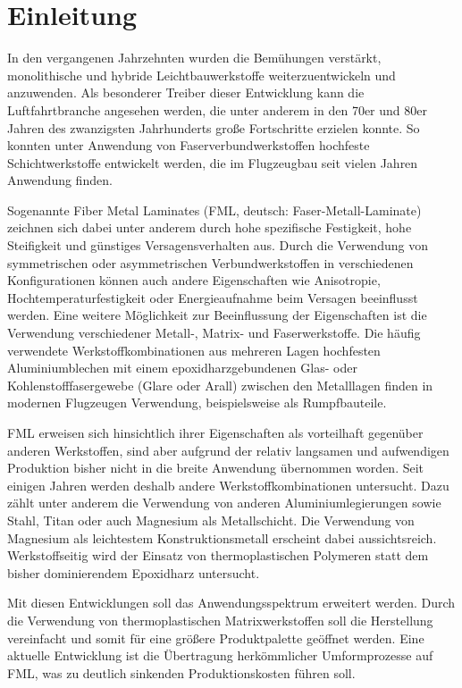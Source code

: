 \chapter{Einleitung}\label{Einleit}

In den vergangenen Jahrzehnten wurden die Bemühungen verstärkt, monolithische und hybride  Leichtbauwerkstoffe weiterzuentwickeln und anzuwenden. Als besonderer Treiber dieser Entwicklung kann die Luftfahrtbranche angesehen werden, die unter anderem in den 70er und 80er Jahren des zwanzigsten Jahrhunderts große Fortschritte erzielen konnte. So konnten unter Anwendung von Faserverbundwerkstoffen hochfeste Schichtwerkstoffe entwickelt werden, die im Flugzeugbau seit vielen Jahren Anwendung finden.

Sogenannte Fiber Metal Laminates (FML, deutsch: Faser-Metall-Laminate) zeichnen sich dabei unter anderem durch hohe spezifische Festigkeit, hohe Steifigkeit und günstiges Versagensverhalten aus. Durch die Verwendung von symmetrischen oder asymmetrischen Verbundwerkstoffen in verschiedenen Konfigurationen können auch andere Eigenschaften wie Anisotropie, Hochtemperaturfestigkeit oder Energieaufnahme beim Versagen beeinflusst werden. Eine weitere Möglichkeit zur Beeinflussung der Eigenschaften ist die Verwendung verschiedener Metall-, Matrix- und Faserwerkstoffe. 
Die häufig verwendete Werkstoffkombinationen aus mehreren Lagen hochfesten Aluminiumblechen mit einem epoxidharzgebundenen Glas- oder Kohlenstofffasergewebe (Glare oder Arall) zwischen den Metalllagen finden in modernen Flugzeugen Verwendung, beispielsweise als Rumpfbauteile.

FML erweisen sich hinsichtlich ihrer Eigenschaften als vorteilhaft gegenüber anderen Werkstoffen, sind aber aufgrund der relativ langsamen und aufwendigen Produktion bisher nicht in die breite Anwendung übernommen worden. 
Seit einigen Jahren werden deshalb andere Werkstoffkombinationen untersucht. Dazu zählt unter anderem die Verwendung von anderen Aluminiumlegierungen sowie Stahl, Titan oder auch Magnesium als Metallschicht. Die Verwendung von Magnesium als leichtestem Konstruktionsmetall erscheint dabei aussichtsreich.
Werkstoffseitig wird der Einsatz von thermoplastischen Polymeren statt dem bisher dominierendem Epoxidharz untersucht. 

Mit diesen Entwicklungen soll das Anwendungsspektrum erweitert werden. Durch die Verwendung von thermoplastischen Matrixwerkstoffen soll die Herstellung vereinfacht und somit für eine größere Produktpalette geöffnet werden. Eine aktuelle Entwicklung ist die Übertragung herkömmlicher Umformprozesse auf FML, was zu deutlich sinkenden Produktionskosten führen soll.

